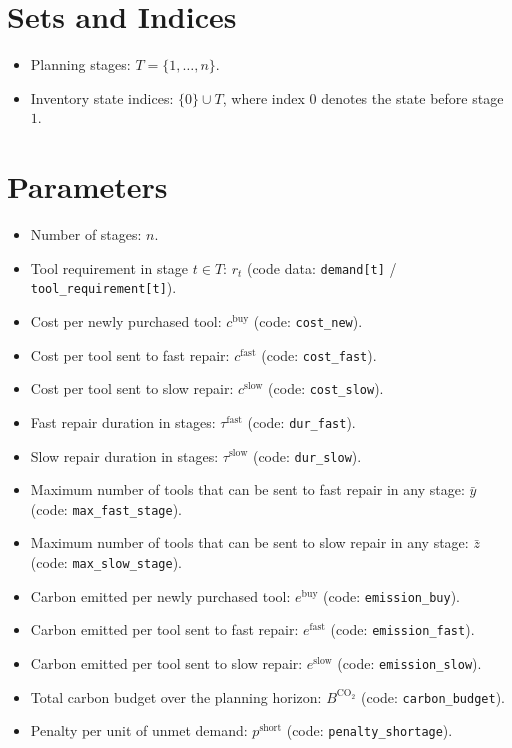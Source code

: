 \section*{Sets and Indices}

\begin{itemize}
    \item Planning stages: $T=\{1,\dots,n\}$.
    \item Inventory state indices: $\{0\}\cup T$, where index $0$ denotes the state before stage $1$.
\end{itemize}

\section*{Parameters}

\begin{itemize}
    \item Number of stages: $n$.
    \item Tool requirement in stage $t\in T$: $r_t$ (code data: \texttt{demand[t]} / \texttt{tool\_requirement[t]}).
    \item Cost per newly purchased tool: $c^{\text{buy}}$ (code: \texttt{cost\_new}).
    \item Cost per tool sent to fast repair: $c^{\text{fast}}$ (code: \texttt{cost\_fast}).
    \item Cost per tool sent to slow repair: $c^{\text{slow}}$ (code: \texttt{cost\_slow}).
    \item Fast repair duration in stages: $\tau^{\text{fast}}$ (code: \texttt{dur\_fast}).
    \item Slow repair duration in stages: $\tau^{\text{slow}}$ (code: \texttt{dur\_slow}).
    \item Maximum number of tools that can be sent to fast repair in any stage: $\bar y$ (code: \texttt{max\_fast\_stage}).
    \item Maximum number of tools that can be sent to slow repair in any stage: $\bar z$ (code: \texttt{max\_slow\_stage}).
    \item Carbon emitted per newly purchased tool: $e^{\text{buy}}$ (code: \texttt{emission\_buy}).
    \item Carbon emitted per tool sent to fast repair: $e^{\text{fast}}$ (code: \texttt{emission\_fast}).
    \item Carbon emitted per tool sent to slow repair: $e^{\text{slow}}$ (code: \texttt{emission\_slow}).
    \item Total carbon budget over the planning horizon: $B^{\text{CO}_2}$ (code: \texttt{carbon\_budget}).
    \item Penalty per unit of unmet demand: $p^{\text{short}}$ (code: \texttt{penalty\_shortage}).
\end{itemize}

